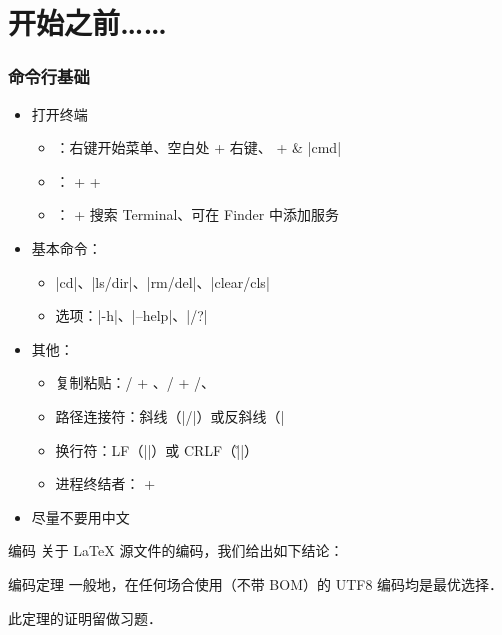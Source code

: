 \section{开始之前……}

\begin{frame}[fragile]
\frametitle{命令行基础}
\begin{itemize}
  \item 打开终端
    \begin{itemize}
      \item \faWindows{}：右键开始菜单、空白处  + 右键、 +  \& |cmd|
      \item \faLinux{}： +  + 
      \item \faApple{}： +  搜索 Terminal、可在 Finder 中添加服务
    \end{itemize}
  \item 基本命令：
    \begin{itemize}
      \item |cd|、|ls/dir|、|rm/del|、|clear/cls|
      \item 选项：|-h|、|--help|、|/?|
    \end{itemize}
  \item 其他：
    \begin{itemize}
      \item 复制粘贴：/ + 、/ + /、
      \item 路径连接符：斜线（|/|）或反斜线（|\|）
      \item 换行符：LF（|\n|）或 CRLF（|\r\n|）
      \item 进程终结者： + 
    \end{itemize} \pause
  \item \alert{尽量不要用中文}
\end{itemize}
\end{frame}

\begin{frame}{编码}
关于 \LaTeX{} 源文件的编码，我们给出如下结论：\pause
\begin{alertblock}{编码定理}
  一般地，在任何场合使用（不带 BOM）的 \alert{UTF\CASE{-}8} 编码均是最优选择．
\end{alertblock} \pause
此定理的证明留做习题．
\end{frame}
